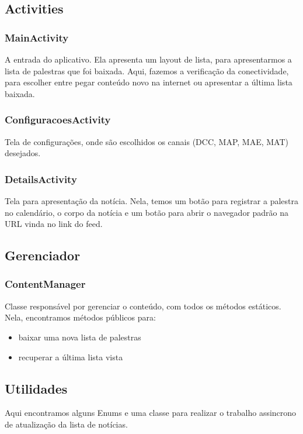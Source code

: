 \subsection{Activities}

\subsubsection{MainActivity}
A entrada do aplicativo. Ela apresenta um layout de lista, para apresentarmos a lista de palestras que foi baixada.
Aqui, fazemos a verificação da conectividade, para escolher entre pegar conteúdo novo na internet ou apresentar a última lista
baixada.

\subsubsection{ConfiguracoesActivity}
Tela de configurações, onde são escolhidos os canais (DCC, MAP, MAE, MAT) desejados.

\subsubsection{DetailsActivity}
Tela para apresentação da notícia. Nela, temos um botão para registrar a palestra no calendário, o corpo da notícia e um botão para abrir o navegador padrão na URL vinda no link do feed.

\subsection{Gerenciador}
\subsubsection{ContentManager}
Classe responsável por gerenciar o conteúdo, com todos os métodos estáticos. Nela, encontramos métodos públicos para:
\begin{itemize}
\item baixar uma nova lista de palestras
\item recuperar a última lista vista
\end{itemize}

\subsection{Utilidades}
Aqui encontramos alguns Enums e uma classe para realizar o trabalho assincrono de atualização da lista de notícias.

